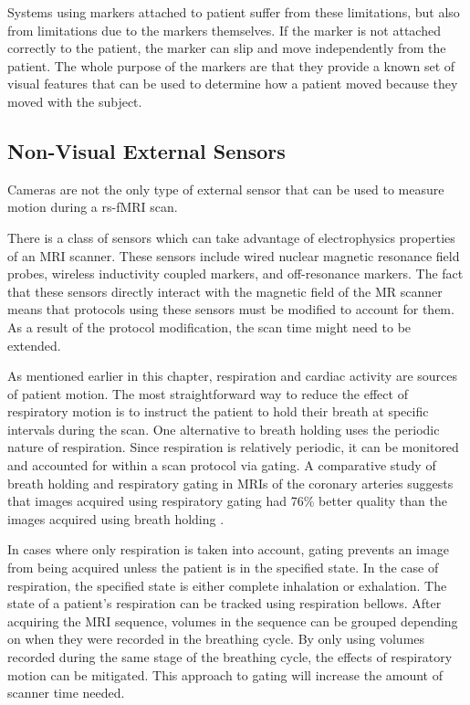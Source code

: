 Systems using markers attached to patient suffer from these limitations, but also from limitations due to the markers themselves. If the marker is not attached correctly to the patient, the marker can slip and move independently from the patient. The whole purpose of the markers are that they provide a known set of visual features that can be used to determine how a patient moved because they moved with the subject.

\subsection{Non-Visual External Sensors}

Cameras are not the only type of external sensor that can be used to measure motion during a rs-fMRI scan. 

There is a class of sensors which can take advantage of electrophysics properties of an MRI scanner. These sensors include wired nuclear magnetic resonance field probes, wireless inductivity coupled markers, and off-resonance markers. %
The fact that these sensors directly interact with the magnetic field of the MR scanner means that protocols using these sensors must be modified to account for them. As a result of the protocol modification, the scan time might need to be extended.

As mentioned earlier in this chapter, respiration and cardiac activity are sources of patient motion. The most straightforward way to reduce the effect of respiratory motion is to instruct the patient to hold their breath at specific intervals during the scan. One alternative to breath holding uses the periodic nature of respiration. Since respiration is relatively periodic, it can be monitored and accounted for within a scan protocol via gating. A comparative study of breath holding and respiratory gating in MRIs of the coronary arteries suggests that images acquired using respiratory gating had 76\% better quality than the images acquired using breath holding \cite{PMID:7822549}.

In cases where only respiration is taken into account, gating prevents an image from being acquired unless the patient is in the specified state. In the case of respiration, the specified state is either complete inhalation or exhalation. The state of a patient's respiration can be tracked using respiration bellows. After acquiring the MRI sequence, volumes in the sequence can be grouped depending on when they were recorded in the breathing cycle. By only using volumes recorded during the same stage of the breathing cycle, the effects of respiratory motion can be mitigated. This approach to gating will increase the amount of scanner time needed.

